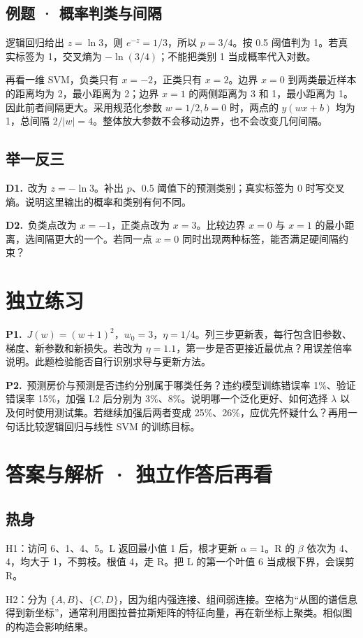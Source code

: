 \documentclass[UTF8,a4paper,11pt]{ctexart}
\newcommand{\PracticeQuestion}[3]{\par\Needspace{4\baselineskip}\noindent\begin{minipage}{\linewidth}\textbf{#1.}\ #2\par\noindent\rule{0pt}{#3mm}\par\end{minipage}\par}
\begin{document}
\subsection{例题 · 概率判类与间隔}
逻辑回归给出 $z=\ln3$，则 $e^{-z}=1/3$，所以 $p=3/4$。按 0.5 阈值判为 1。若真实标签为 1，交叉熵为 $-\ln(3/4)$；不能把类别 1 当成概率代入对数。

再看一维 SVM，负类只有 $x=-2$，正类只有 $x=2$。边界 $x=0$ 到两类最近样本的距离均为 2，最小距离为 2；边界 $x=1$ 的两侧距离为 3 和 1，最小距离为 1。因此前者间隔更大。采用规范化参数 $w=1/2,b=0$ 时，两点的 $y(wx+b)$ 均为 1，总间隔 $2/|w|=4$。整体放大参数不会移动边界，也不会改变几何间隔。

\subsection{举一反三}
\PracticeQuestion{D1}{改为 $z=-\ln3$。补出 $p$、0.5 阈值下的预测类别；真实标签为 0 时写交叉熵。说明这里输出的概率和类别有何不同。}{32}
\PracticeQuestion{D2}{负类点改为 $x=-1$，正类点改为 $x=3$。比较边界 $x=0$ 与 $x=1$ 的最小距离，选间隔更大的一个。若同一点 $x=0$ 同时出现两种标签，能否满足硬间隔约束？}{32}
\clearpage
\section{独立练习}
\PracticeQuestion{P1}{$J(w)=(w+1)^2$，$w_0=3$，$\eta=1/4$。列三步更新表，每行包含旧参数、梯度、新参数和新损失。若改为 $\eta=1.1$，第一步是否更接近最优点？用误差倍率说明。此题检验能否自行识别求导与更新方法。}{35}
\PracticeQuestion{P2}{预测房价与预测是否违约分别属于哪类任务？违约模型训练错误率 1\%、验证错误率 15\%，加强 L2 后分别为 3\%、8\%。说明哪一个泛化更好、如何选择 $\lambda$ 以及何时使用测试集。若继续加强后两者变成 25\%、26\%，应优先怀疑什么？再用一句话比较逻辑回归与线性 SVM 的训练目标。}{35}
\clearpage
\section{答案与解析 · 独立作答后再看}
\subsection{热身}
H1：访问 6、1、4、5。L 返回最小值 1 后，根才更新 $\alpha=1$。R 的 $\beta$ 依次为 4、4，均大于 1，不剪枝。根值 4，走 R。把 L 的第一个叶值 6 当成根下界，会误剪 R。

H2：分为 $\{A,B\}$、$\{C,D\}$，因为组内强连接、组间弱连接。空格为“从图的谱信息得到新坐标”，通常利用图拉普拉斯矩阵的特征向量，再在新坐标上聚类。相似图的构造会影响结果。
\end{document}
